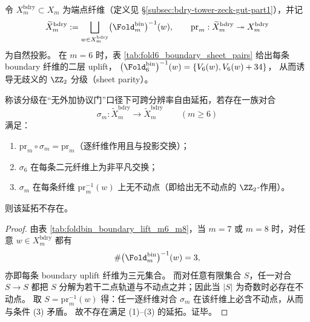 \begin{theorem}\label{thm:window6-bdry-sheet-parity-nonfunctorial-extension}
令 \(X_m^{\mathrm{bdry}}\subset X_m\) 为端点纤维（定义见 \S\ref{subsec:bdry-tower-zeck-gut-part1}），并记
\[
\widetilde X_m^{\mathrm{bdry}}
:=\bigsqcup_{w\in X_m^{\mathrm{bdry}}}\bigl(\Fold^{\mathrm{bin}}_m\bigr)^{-1}(w),
\qquad
\mathrm{pr}_m:\widetilde X_m^{\mathrm{bdry}}\twoheadrightarrow X_m^{\mathrm{bdry}}
\]
为自然投影。
在 \(m=6\) 时，表 \ref{tab:fold6_boundary_sheet_pairs} 给出每条 boundary 纤维的二层 uplift，
\(
\bigl(\Fold^{\mathrm{bin}}_6\bigr)^{-1}(w)=\{V_6(w),V_6(w)+34\}
\)，
从而诱导无歧义的 \(\ZZ_2\) 分级（sheet parity）。
\par
称该分级在“无外加协议门”口径下可跨分辨率自由延拓，若存在一族对合
\[
\sigma_m:\widetilde X_m^{\mathrm{bdry}}\longrightarrow \widetilde X_m^{\mathrm{bdry}}
\qquad(m\ge 6)
\]
满足：
\begin{enumerate}
\normalfont
  \item \(\mathrm{pr}_m\circ\sigma_m=\mathrm{pr}_m\)（逐纤维作用且与投影交换）；
  \item \(\sigma_6\) 在每条二元纤维上为非平凡交换；
  \item \(\sigma_m\) 在每条纤维 \(\mathrm{pr}_m^{-1}(w)\) 上无不动点（即给出无不动点的 \(\ZZ_2\)-作用）。
\end{enumerate}
则该延拓不存在。
\end{theorem}

\begin{proof}
由表 \ref{tab:foldbin_boundary_lift_m6_m8}，当 \(m=7\) 或 \(m=8\) 时，对任意 \(w\in X_m^{\mathrm{bdry}}\) 都有
\[
\#\bigl(\Fold^{\mathrm{bin}}_m\bigr)^{-1}(w)=3,
\]
亦即每条 boundary uplift 纤维为三元集合。
而对任意有限集合 \(S\)，任一对合 \(S\to S\) 都把 \(S\) 分解为若干二点轨道与不动点之并；因此当 \(|S|\) 为奇数时必存在不动点。
取 \(S=\mathrm{pr}_m^{-1}(w)\) 得：任一逐纤维对合 \(\sigma_m\) 在该纤维上必含不动点，从而与条件 (3) 矛盾。
故不存在满足 (1)--(3) 的延拓。证毕。
\end{proof}

